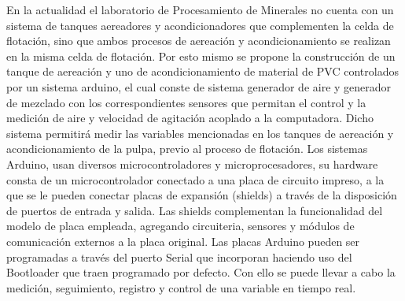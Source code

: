 \documentclass[11pt,letter
								]
								{article}
\begin{document}
En la actualidad el laboratorio de Procesamiento de Minerales no cuenta con un sistema de tanques aereadores y acondicionadores que complementen la celda de flotación, sino que ambos procesos de aereación y acondicionamiento se realizan en la misma celda de flotación. Por esto mismo se propone la construcción de un tanque de aereación y uno de acondicionamiento de material de PVC controlados por un sistema arduino, el cual conste de sistema generador de aire y generador de mezclado con los correspondientes sensores que permitan el control y la medición de aire y velocidad de agitación acoplado a la computadora. Dicho sistema permitirá medir las variables mencionadas en los tanques de aereación y acondicionamiento de la pulpa, previo al proceso de flotación. Los sistemas Arduino, usan diversos microcontroladores y microprocesadores, su hardware consta de un microcontrolador conectado a una placa de circuito impreso, a la que se le pueden conectar placas de expansión (shields) a través de la disposición de puertos de entrada y salida. Las shields complementan la funcionalidad del modelo de placa empleada, agregando circuiteria, sensores y módulos de comunicación externos a la placa original. Las placas Arduino pueden ser programadas a través del puerto Serial que incorporan haciendo uso del Bootloader que traen programado por defecto. Con ello se puede llevar a cabo la medición, seguimiento, registro y control de una variable en tiempo real.
\end{document}
